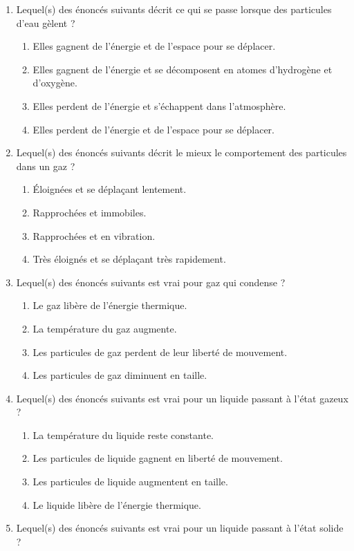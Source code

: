 \documentclass[
  11pt,
  a4paper,
  openany]{book}
\providecommand{\tightlist}{%
  \setlength{\itemsep}{0pt}\setlength{\parskip}{0pt}}
\begin{document}
\begin{Exercise}

\begin{enumerate}
\def\labelenumi{\arabic{enumi}.}
\tightlist
\item
  Lequel(s) des énoncés suivants décrit ce qui se passe lorsque des particules d'eau gèlent ?

  \begin{enumerate}
  \def\labelenumii{\alph{enumii}.}
  \tightlist
  \item
    Elles gagnent de l'énergie et de l'espace pour se déplacer.
  \item
    Elles gagnent de l'énergie et se décomposent en atomes d'hydrogène et d'oxygène.
  \item
    Elles perdent de l'énergie et s'échappent dans l'atmosphère.
  \item
    Elles perdent de l'énergie et de l'espace pour se déplacer.
  \end{enumerate}
\item
  Lequel(s) des énoncés suivants décrit le mieux le comportement des particules dans un gaz ?

  \begin{enumerate}
  \def\labelenumii{\alph{enumii}.}
  \tightlist
  \item
    Éloignées et se déplaçant lentement.
  \item
    Rapprochées et immobiles.
  \item
    Rapprochées et en vibration.
  \item
    Très éloignés et se déplaçant très rapidement.
  \end{enumerate}
\item
  Lequel(s) des énoncés suivants est vrai pour gaz qui condense ?

  \begin{enumerate}
  \def\labelenumii{\alph{enumii}.}
  \tightlist
  \item
    Le gaz libère de l'énergie thermique.
  \item
    La température du gaz augmente.
  \item
    Les particules de gaz perdent de leur liberté de mouvement.
  \item
    Les particules de gaz diminuent en taille.
  \end{enumerate}
\item
  Lequel(s) des énoncés suivants est vrai pour un liquide passant à l'état gazeux ?

  \begin{enumerate}
  \def\labelenumii{\alph{enumii}.}
  \tightlist
  \item
    La température du liquide reste constante.
  \item
    Les particules de liquide gagnent en liberté de mouvement.
  \item
    Les particules de liquide augmentent en taille.
  \item
    Le liquide libère de l'énergie thermique.
  \end{enumerate}
\item
  Lequel(s) des énoncés suivants est vrai pour un liquide passant à l'état solide ?


\end{enumerate}
\end{Exercise}
\end{document}
